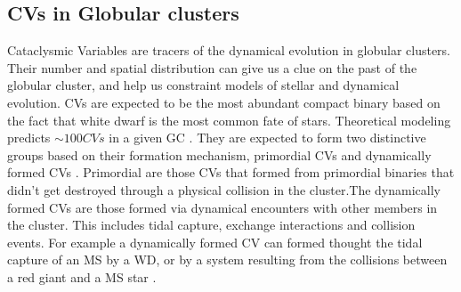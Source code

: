 

%

\subsection{CVs in Globular clusters}\label{sec:cogc}

Cataclysmic Variables are tracers of the dynamical evolution in globular clusters. Their number and spatial distribution can give us a clue on the past of the globular cluster, and help us constraint models of stellar and dynamical evolution. CVs are expected to be the most abundant compact binary based on the fact that white dwarf is the most common fate of stars. Theoretical modeling predicts $\sim 100CVs$ in a given GC \citep{ivanova_formation_2006}.  They are expected to form two distinctive groups based on their formation mechanism, primordial CVs and dynamically formed CVs \citep{hut_binaries_1992}. Primordial are those CVs that formed from primordial binaries that didn't get destroyed through a physical collision in the cluster.The dynamically formed CVs are those formed via dynamical encounters with other members in the cluster. This includes tidal capture, exchange interactions and collision events. For example a dynamically formed CV can formed thought the tidal capture of an MS by a WD, or by a system resulting from the collisions between a red giant and a MS star \citep{ivanova_formation_2006}. 


